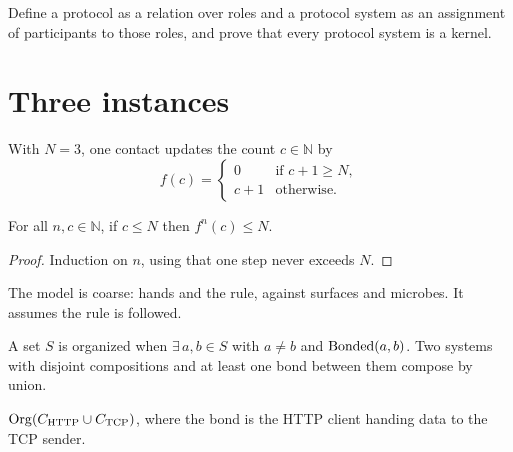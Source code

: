 \begin{problem}
  \label{prob:formalize-protocol}
  Define a protocol as a relation over roles and a protocol system as an
  assignment of participants to those roles, and prove that every protocol
  system is a kernel.
\end{problem}

\chapter{Three instances}

\begin{definition}
  \label{def:hw-step}
  \leanok
  With $N = 3$, one contact updates the count $c \in \mathbb{N}$ by
  \[
    f(c) =
    \begin{cases}
      0 & \text{if } c + 1 \ge N, \\
      c + 1 & \text{otherwise.}
    \end{cases}
  \]
\end{definition}

\begin{theorem}
  \label{thm:hand-washing}
  \leanok
  For all $n, c \in \mathbb{N}$, if $c \le N$ then $f^{n}(c) \le N$.
\end{theorem}

\begin{proof}
  \leanok
  Induction on $n$, using that one step never exceeds $N$.
\end{proof}

\begin{remark}
  The model is coarse: hands and the rule, against surfaces and microbes. It
  assumes the rule is followed.
\end{remark}

\begin{definition}[Organized]
  \label{def:organized}
  \leanok
  A set $S$ is organized when $\exists\, a, b \in S$ with $a \neq b$ and
  $\operatorname{Bonded}(a, b)$. Two systems with disjoint compositions and at least one
  bond between them compose by union.
\end{definition}

\begin{theorem}
  \label{thm:tcp-http}
  \leanok
  $\operatorname{Org}(C_{\mathrm{HTTP}} \cup C_{\mathrm{TCP}})$, where the bond is the HTTP
  client handing data to the TCP sender.
\end{theorem}

